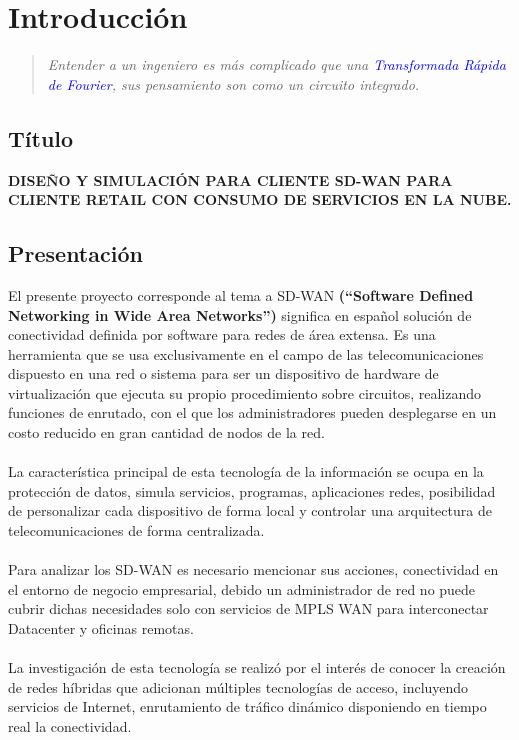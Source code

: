 \newcommand{\novathesis}{\emph{novathesis}}
\newcommand{\novathesisclass}{\texttt{novathesis.cls}}


\chapter{Introducción}
\label{cha:Introducción}

\begin{quotation}
  \itshape
   Entender a un ingeniero es más complicado que una \textcolor{blue}{Transformada Rápida de Fourier},  sus pensamiento son como un circuito integrado.  
\end{quotation}

\section{Título} %
\label{sec:Título}

\textbf{DISEÑO Y SIMULACIÓN PARA CLIENTE SD-WAN PARA CLIENTE
RETAIL CON CONSUMO DE SERVICIOS EN LA NUBE.}
\section{Presentación} %
\label{sec:Presentación}

El presente proyecto corresponde al tema a SD-WAN \textbf{(“Software Defined Networking in Wide Area Networks”)} significa en español solución de conectividad
definida por software para redes de área extensa. Es una herramienta que se usa exclusivamente en el campo de las telecomunicaciones dispuesto en una red o sistema para
ser un dispositivo de hardware de virtualización que ejecuta su propio procedimiento sobre circuitos, realizando funciones de enrutado, con el que los administradores pueden
desplegarse en un costo reducido en gran cantidad de nodos de la red.
%
\\
\\
La característica principal de esta tecnología de la información se ocupa en la protección
de datos, simula servicios, programas, aplicaciones redes, posibilidad de personalizar cada dispositivo de forma local y controlar una arquitectura de telecomunicaciones de
forma centralizada.
%
\\
\\
Para analizar los SD-WAN es necesario mencionar sus acciones, conectividad en el entorno de negocio empresarial, 
debido un administrador de red no puede cubrir
dichas necesidades solo con servicios de MPLS WAN para interconectar Datacenter y oficinas remotas.
%
\\
\\
La investigación de esta tecnología se realizó por el interés de conocer la creación de redes híbridas que adicionan múltiples tecnologías de acceso, incluyendo servicios de
Internet, enrutamiento de tráfico dinámico disponiendo en tiempo real la conectividad.

